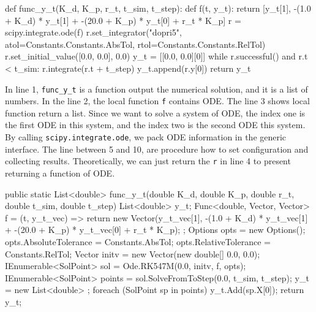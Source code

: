 \begin{listing}
\begin{python1}
def func_y_t(K_d, K_p, r_t, t_sim, t_step):
	def f(t, y_t):
		return [y_t[1], -(1.0 + K_d) * y_t[1] + -(20.0 + K_p) * y_t[0] + r_t * K_p]
	r = scipy.integrate.ode(f)
	r.set_integrator("dopri5", atol=Constants.Constants.AbsTol, rtol=Constants.Constants.RelTol)
	r.set_initial_value([0.0, 0.0], 0.0)
	y_t = [[0.0, 0.0][0]]
	while r.successful() and r.t < t_sim:
		r.integrate(r.t + t_step)
		y_t.append(r.y[0])
	return y_t
\end{python1}
\label{code_pythonscipy}
\end{listing}

In line 1, \verb|func_y_t| is a function output the numerical solution, and it is a list of numbers. In the line 2, the local function \verb|f| contains ODE. The line 3 shows local function return a list. Since we want to solve a system of ODE, the index one is the first ODE in this system, and the index two is the second ODE this system. By calling \verb|scipy.integrate.ode|, we pack ODE information in the generic interface. The line between 5 and 10, are procedure how to set configuration and collecting results. Theoretically, we can just return the \verb|r| in line 4 to present returning a function of ODE.

\begin{listing}
\begin{csharp1}
public static List<double> func_y_t(double K_d, double K_p, double r_t, double t_sim, double t_step) {
	List<double> y_t;
	Func<double, Vector, Vector> f = (t, y_t_vec) => {
		return new Vector(y_t_vec[1], -(1.0 + K_d) * y_t_vec[1] + -(20.0 + K_p) * y_t_vec[0] + r_t * K_p);
	};
	Options opts = new Options();
	opts.AbsoluteTolerance = Constants.AbsTol;
	opts.RelativeTolerance = Constants.RelTol;
	Vector initv = new Vector(new double[] {0.0, 0.0});
	IEnumerable<SolPoint> sol = Ode.RK547M(0.0, initv, f, opts);
	IEnumerable<SolPoint> points = sol.SolveFromToStep(0.0, t_sim, t_step);
	y_t = new List<double> {};
	foreach (SolPoint sp in points) {
		y_t.Add(sp.X[0]);
	}
	return y_t;
}
\end{csharp1}
\label{code_csharposlo}
\end{listing}
